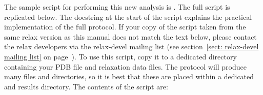 The sample script for performing this new analysis is .
The full script is replicated below.
The docstring at the start of the script explains the practical implementation of the full protocol.
If your copy of the  script taken from the same relax version as this manual does not match the text below, please contact the relax developers via the relax-devel mailing list (see section~\ref{sect: relax-devel mailing list} on page~\pageref{sect: relax-devel mailing list}).
To use this script, copy it to a dedicated directory containing your PDB file and relaxation data files.
The protocol will produce many files and directories, so it is best that these are placed within a dedicated and results directory.
The contents of the script are:

